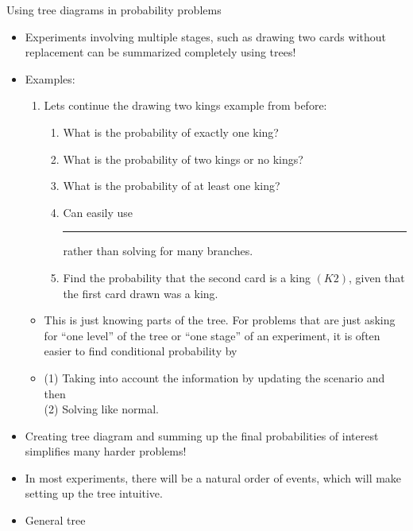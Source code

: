 \documentclass{article}
\newcommand{\blankul}[1]{\rule[-1.5mm]{#1}{0.15mm}}	%
\begin{document}
Using tree diagrams in probability problems\bigskip
\begin{itemize}
    \item Experiments involving multiple stages, such as drawing two cards without replacement can be summarized completely using trees!
    \item Examples:
    \begin{enumerate}
        \item Lets continue the drawing two kings example from before:\vspace{150pt}
        \begin{enumerate}
            \item What is the probability of exactly one king?\vspace{120pt}
            \item What is the probability of two kings or no kings?\vspace{50pt}
            \item What is the probability of at least one king?\vspace{60pt}
            \item[] Can easily use \blankul{3cm} rather than solving for many branches.\\
            \item Find the probability that the second card is a king $(K2)$, given that the first card drawn was a king.\vspace{30pt}
        \end{enumerate}
     \end{enumerate}
     \begin{itemize}
        \item This is just knowing parts of the tree. For problems that are just asking for ``one level'' of the tree or ``one stage'' of an experiment, it is often easier to find conditional probability by
        \item[] (1) Taking into account the information by updating the scenario and then \\(2) Solving like normal.
    \end{itemize}\bigskip
    \item Creating tree diagram and summing up the final probabilities of interest simplifies many harder problems!
    \item[] In most experiments, there will be a natural order of events, which will make setting up the tree intuitive.
    \item General tree
    \begin{figure}[H]

\end{figure}
\end{itemize}
\end{document}
